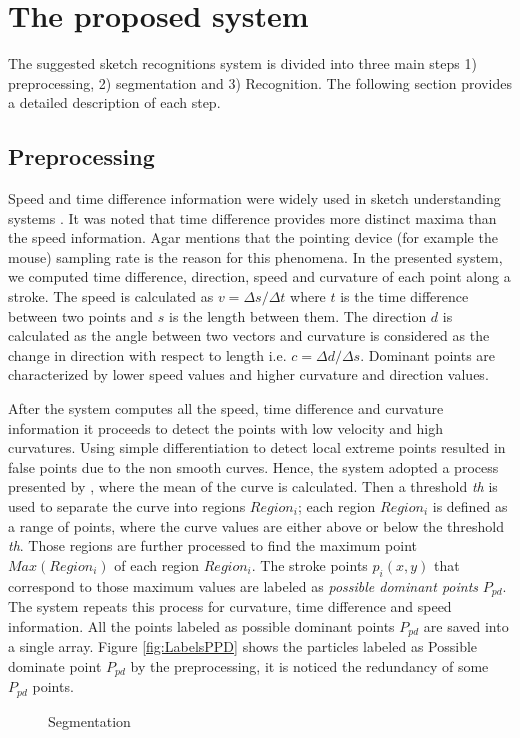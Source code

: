 \documentclass{article}
\begin{document}
\section{The proposed system}
\label{Sysdisc}
 The suggested sketch recognitions system is divided into three main steps 1) preprocessing, 2) segmentation and 3) Recognition. The following section provides a detailed description of each step.
\subsection{Preprocessing}
\label{Prepross}
 Speed and time difference information were widely used in sketch understanding systems \cite{earlyprocess}. It was noted that time difference provides more distinct maxima than the speed information. Agar \cite{polygonfeedback31} mentions that the pointing device (for example the mouse) sampling rate is the reason for this phenomena. 
 In the presented system, we computed time difference, direction, speed and curvature of each point along a stroke. The speed is calculated as $v=\Delta s/\Delta t$ where $t$ is the time difference between two points and $s$ is the length between them. The direction $d$ is calculated as the angle between two vectors and curvature is considered as the change in direction with respect to length i.e. $c= \Delta d/\Delta s$.  Dominant points are characterized by lower speed values and higher curvature and direction values.
  
After the system computes all the speed, time difference and curvature information it proceeds to detect the points with low velocity and high curvatures. Using simple differentiation to detect local extreme points resulted in false points due to the non smooth curves. Hence, the system adopted a process presented by \cite{earlyprocess}, where the mean of the curve is calculated. Then a threshold \textit{th} is used to separate the curve into regions $Region_i$; each region $Region_i$ is defined as a range of points, where the curve values are either above or below the threshold \textit{th}. Those regions are further processed to find the maximum point $Max(Region_i)$ of each region $Region_i$. The stroke points $p_i(x,y)$ that correspond to those maximum values are labeled as \textit{possible dominant points} $P_{pd}$. The system repeats this process for curvature, time difference and speed information. All the points labeled as possible dominant points $P_{pd}$ are saved into a single array. Figure \ref{fig:LabelsPPD} shows the particles labeled as Possible dominate point $P_{pd}$ by the preprocessing, it is noticed the redundancy of some $P_{pd}$ points. %
\begin{figure}
	\centering
		\hfill
	\caption{Segmentation}%
	\label{fig:pso1}
\end{figure}
\end{document}
